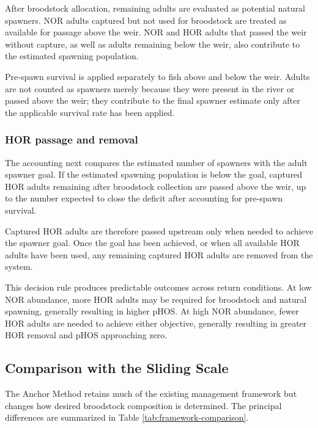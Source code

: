 \documentclass[12pt,letterpaper]{article}
\begin{document}
After broodstock allocation, remaining adults are evaluated as potential natural spawners. NOR adults captured but not used for broodstock are treated as available for passage above the weir. NOR and HOR adults that passed the weir without capture, as well as adults remaining below the weir, also contribute to the estimated spawning population.

Pre-spawn survival is applied separately to fish above and below the weir. Adults are not counted as spawners merely because they were present in the river or passed above the weir; they contribute to the final spawner estimate only after the applicable survival rate has been applied.

\subsubsection{HOR passage and removal}\label{hor-passage-and-removal}

The accounting next compares the estimated number of spawners with the adult spawner goal. If the estimated spawning population is below the goal, captured HOR adults remaining after broodstock collection are passed above the weir, up to the number expected to close the deficit after accounting for pre-spawn survival.

Captured HOR adults are therefore passed upstream only when needed to achieve the spawner goal. Once the goal has been achieved, or when all available HOR adults have been used, any remaining captured HOR adults are removed from the system.

This decision rule produces predictable outcomes across return conditions. At low NOR abundance, more HOR adults may be required for broodstock and natural spawning, generally resulting in higher pHOS. At high NOR abundance, fewer HOR adults are needed to achieve either objective, generally resulting in greater HOR removal and pHOS approaching zero.

\subsection{Comparison with the Sliding Scale}\label{comparison-with-the-sliding-scale}

The Anchor Method retains much of the existing management framework but changes how desired broodstock composition is determined. The principal differences are summarized in Table \ref{tab:framework-comparison}.
\end{document}
